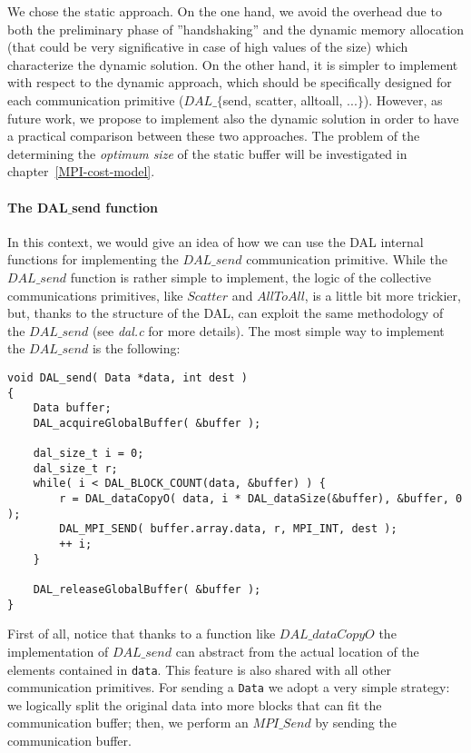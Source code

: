 We chose the static approach. On the one hand, we avoid the overhead due to both the preliminary phase of ''handshaking'' and the dynamic memory allocation (that could be very significative in case of high values of the size) which characterize the dynamic solution. On the other hand, it is simpler to implement with respect to the dynamic approach, which should be specifically designed for each communication primitive ($DAL\_\lbrace$send, scatter, alltoall, ...$\rbrace$). However, as future work, we propose to implement also the dynamic solution in order to have a practical comparison between these two approaches. The problem of the determining the \textit{optimum size} of the static buffer will be investigated in chapter~\ref{MPI-cost-model}.

\paragraph{The DAL$\_$send function}
In this context, we would give an idea of how we can use the DAL internal functions for implementing the $DAL\_send$ communication primitive. While the $DAL\_send$ function is rather simple to implement, the logic of the collective communications primitives, like $Scatter$ and $AllToAll$, is a little bit more trickier, but, thanks to the structure of the DAL, can exploit the same methodology of the $DAL\_send$ (see \textit{dal.c} for more details). The most simple way to implement the $DAL\_send$ is the following:
\begin{lstlisting}
void DAL_send( Data *data, int dest )
{
	Data buffer;
	DAL_acquireGlobalBuffer( &buffer );

	dal_size_t i = 0;
	dal_size_t r;
	while( i < DAL_BLOCK_COUNT(data, &buffer) ) {
		r = DAL_dataCopyO( data, i * DAL_dataSize(&buffer), &buffer, 0 );
		DAL_MPI_SEND( buffer.array.data, r, MPI_INT, dest );
		++ i;
	}

	DAL_releaseGlobalBuffer( &buffer );
}
\end{lstlisting}
First of all, notice that thanks to a function like $DAL\_dataCopyO$ the implementation of $DAL\_send$ can abstract from the actual location of the elements contained in \texttt{data}. This feature is also shared with all other communication primitives. For sending a \texttt{Data} we adopt a very simple strategy: we logically split the original data into more blocks that can fit the communication buffer; then, we perform an $MPI\_Send$ by sending the communication buffer.
